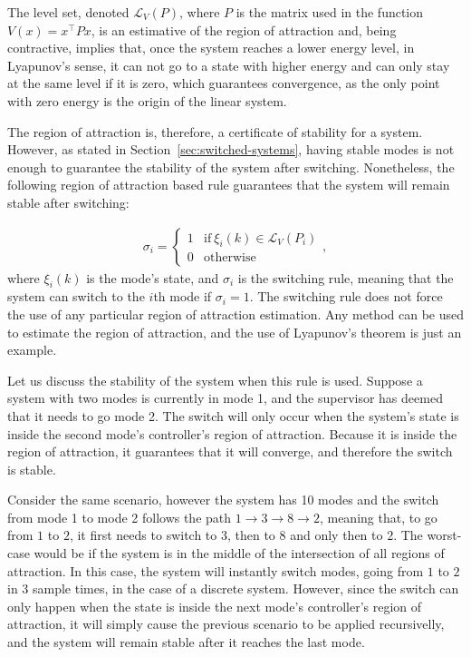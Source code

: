 The level set, denoted \(\mathcal{L}_{V}(P)\), where \(P\) is the matrix used in
the function \(V(x)=x^{\top}Px\), is an estimative of the region of attraction and,
being contractive, implies that, once the system reaches a lower energy level,
in Lyapunov's sense, it can not go to a state with higher energy and can only
stay at the same level if it is zero, which guarantees convergence, as the only
point with zero energy is the origin of the linear system.

The region of attraction is, therefore, a certificate of stability for a system.
However, as stated in Section~\ref{sec:switched-systems}, having stable modes is
not enough to guarantee the stability of the system after switching.
Nonetheless, the following region of attraction based rule guarantees that the
system will remain stable after switching:

\begin{align}
  \sigma_{i} = \begin{cases}
    1 & \textrm{if}~\xi_{i}(k)\in\mathcal{L}_V(P_i) \\
    0 & \textrm{otherwise}
  \end{cases},
\end{align}
%
where \(\xi_{i}(k)\) is the mode's state, and \(\sigma_{i}\) is the switching rule,
meaning that the system can switch to the \(i\)th mode if \(\sigma_{i}=1\). The
switching rule does not force the use of any particular region of attraction
estimation. Any method can be used to estimate the region of attraction, and the
use of Lyapunov's theorem is just an example.

Let us discuss the stability of the system when this rule is used. Suppose a
system with two modes is currently in mode 1, and the supervisor has deemed that
it needs to go mode 2. The switch will only occur when the system's state is
inside the second mode's controller's region of attraction. Because it is inside
the region of attraction, it guarantees that it will converge, and therefore the
switch is stable.

Consider the same scenario, however the system has 10 modes and the switch from
mode 1 to mode 2 follows the path \(1 \rightarrow 3 \rightarrow 8 \rightarrow 2\), meaning that, to go from
\(1\) to \(2\), it first needs to switch to \(3\), then to \(8\) and only then
to \(2\). The worst-case would be if the system is in the middle of the
intersection of all regions of attraction. In this case, the system will
instantly switch modes, going from \(1\) to \(2\) in \(3\) sample times, in the
case of a discrete system. However, since the switch can only happen when the
state is inside the next mode's controller's region of attraction, it will
simply cause the previous scenario to be applied recursivelly, and the system
will remain stable after it reaches the last mode.

